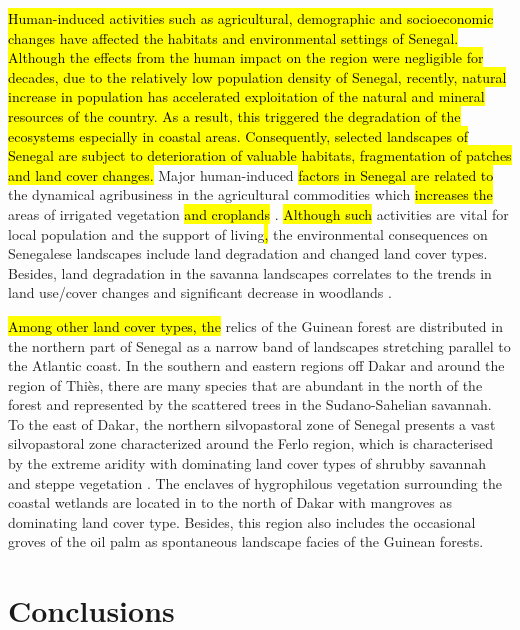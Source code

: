 \documentclass[earth,article,submit,pdftex,moreauthors]{Definitions/mdpi}
\begin{document}
\hl{Human-induced activities such as agricultural, demographic and socioeconomic changes have affected the habitats and environmental settings of Senegal. Although the effects from the human impact on the region were negligible for decades, due to the relatively low population density of Senegal, recently, natural increase in population has accelerated exploitation of the natural and mineral resources of the country. As a result, this triggered the degradation of the ecosystems especially in coastal areas. Consequently, selected landscapes of Senegal are subject to deterioration of valuable habitats, fragmentation of patches and land cover changes.} Major human-induced \hl{factors in Senegal are related to} the dynamical agribusiness in the agricultural commodities which \hl{increases the }  areas of irrigated vegetation \hl{and croplands} \cite{land8030042}. \hl{Although such }activities are vital for local population and the support of living\hl{, }the environmental consequences on Senegalese landscapes include land degradation and changed land cover types. Besides, land degradation\hl{ }in the savanna landscapes \hl{ }correlates to the trends in land use/cover changes and significant decrease in woodlands \cite{Kalema}.

\hl{Among other land cover types, the} relics of the Guinean forest are distributed in the northern part of Senegal as a narrow band of landscapes stretching parallel to the Atlantic coast. In the southern and eastern regions off Dakar and around the region of Thiès, there are many species that are abundant in the north of the forest and represented by the scattered trees in the Sudano-Sahelian savannah. To the east of Dakar, the northern silvopastoral zone of Senegal presents a vast silvopastoral zone characterized around the Ferlo region, which is characterised by the extreme aridity with dominating land cover types of shrubby savannah and steppe vegetation \cite{land10070755}. The enclaves of hygrophilous vegetation surrounding the coastal wetlands are located in to the north of Dakar with mangroves as dominating land cover type. Besides, this region also includes the occasional groves of the oil palm as spontaneous landscape facies of the Guinean forests.

\section{Conclusions}
\end{document}

